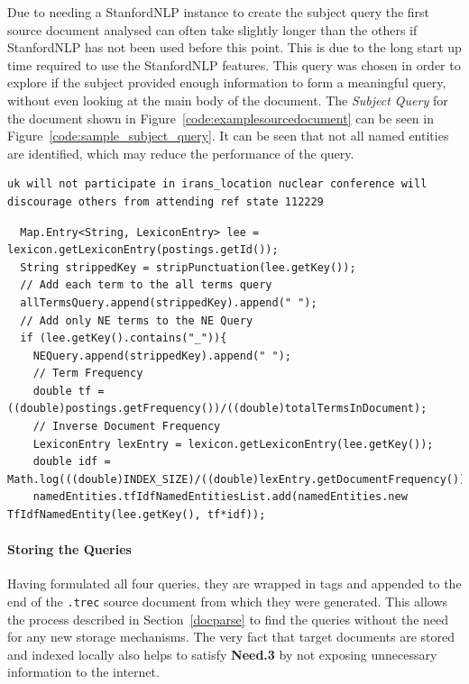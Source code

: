 \documentclass{l4proj}
\newcommand{\code}[1]{\texttt{#1}}
\newenvironment{codelisting}{\captionsetup{type=listing}}{}
\begin{document}
Due to needing a StanfordNLP instance to create the subject query the first source document analysed can often take slightly longer than the others if StanfordNLP has not been used before this point. This is due to the long start up time required to use the StanfordNLP features.
This query was chosen in order to explore if the subject provided enough information to form a meaningful query, without even looking at the main body of the document. The \textit{Subject Query} for the document shown in Figure~\ref{code:examplesourcedocument} can be seen in Figure~\ref{code:sample_subject_query}. It can be seen that not all named entities are identified, which may reduce the performance of the query.
\begin{codelisting}
\begin{verbatim}
uk will not participate in irans_location nuclear conference will discourage others from attending ref state 112229
\end{verbatim}
\label{code:sample_subject_query}
\end{codelisting}
\begin{codelisting}
\begin{verbatim}
  Map.Entry<String, LexiconEntry> lee = lexicon.getLexiconEntry(postings.getId());
  String strippedKey = stripPunctuation(lee.getKey());
  // Add each term to the all terms query
  allTermsQuery.append(strippedKey).append(" ");
  // Add only NE terms to the NE Query 
  if (lee.getKey().contains("_")){
    NEQuery.append(strippedKey).append(" ");
    // Term Frequency
    double tf = ((double)postings.getFrequency())/((double)totalTermsInDocument);
    // Inverse Document Frequency
    LexiconEntry lexEntry = lexicon.getLexiconEntry(lee.getKey());
    double idf = Math.log(((double)INDEX_SIZE)/((double)lexEntry.getDocumentFrequency()));
    namedEntities.tfIdfNamedEntitiesList.add(namedEntities.new TfIdfNamedEntity(lee.getKey(), tf*idf));
\end{verbatim}
\label{code:query_generation}
\end{codelisting}

\paragraph{Storing the Queries}
Having formulated all four queries, they are wrapped in tags and appended to the end of the \code{.trec} source document from which they were generated. This allows the process described in Section~\ref{docparse} to find the queries without the need for any new storage mechanisms. The very fact that target documents are stored and indexed locally also helps to satisfy \textbf{Need.3} by not exposing unnecessary information to the internet.
\end{document}
